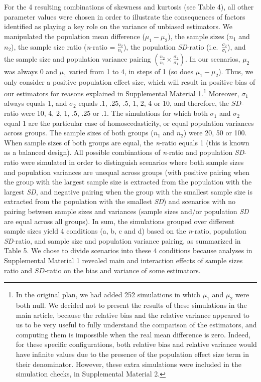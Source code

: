 \documentclass[
  english,
  man,floatsintext]{apa6}
\begin{document}
For the 4 resulting combinations of skewness and kurtosis (see Table 4), all other parameter values were chosen in order to illustrate the consequences of factors identified as playing a key role on the variance of unbiased estimators. We manipulated the population mean difference (\(\mu_1-\mu_2\)), the sample sizes (\(n_1\) and \(n_2\)), the sample size ratio (\emph{n}-ratio = \(\frac{n_2}{n_1}\)), the population \emph{SD}-ratio (i.e.~\(\frac{\sigma_2}{\sigma_1}\)), and the sample size and population variance pairing \(\left(\frac{n_2}{n_1}\times\frac{\sigma_2}{\sigma_1} \right)\). In our scenarios, \(\mu_2\) was always 0 and \(\mu_1\) varied from 1 to 4, in steps of 1 (so does \(\mu_1-\mu_2\)). Thus, we only consider a positive population effect size, which will result in positive bias of our estimators for reasons explained in Supplemental Material 1.\footnote{In the original plan, we had added 252 simulations in which $\mu_1$ and $\mu_2$ were both null. We decided not to present the results of these simulations in the main article, because the relative bias and the relative variance appeared to us to be very useful to fully understand the comparison of the estimators, and computing them is impossible when the real mean difference is zero. Indeed, for these specific configurations, both relative bias and relative variance would have infinite values due to the presence of the population effect size term in their denominator. However, these extra simulations were included in the simulation checks, in Supplemental Material 2. } Moreover, \(\sigma_1\) always equals 1, and \(\sigma_2\) equals .1, .25, .5, 1, 2, 4 or 10, and therefore, the \(SD\)-ratio were 10, 4, 2, 1, .5, .25 or .1. The simulations for which both \(\sigma_1\) and \(\sigma_2\) equal 1 are the particular case of homoscedasticity, or equal population variances across groups. The sample sizes of both groups (\(n_1\) and \(n_2\)) were 20, 50 or 100. When sample sizes of both groups are equal, the \emph{n}-ratio equals 1 (this is known as a balanced design). All possible combinations of \emph{n}-ratio and population \emph{SD}-ratio were simulated in order to distinguish scenarios where both sample sizes and population variances are unequal across groups (with positive pairing when the group with the largest sample size is extracted from the population with the largest \emph{SD}, and negative pairing when the group with the smallest sample size is extracted from the population with the smallest \emph{SD}) and scenarios with no pairing between sample sizes and variances (sample sizes and/or population \emph{SD} are equal across all groups). In sum, the simulations grouped over different sample sizes yield 4 conditions (a, b, c and d) based on the \emph{n}-ratio, population \emph{SD}-ratio, and sample size and population variance pairing, as summarized in Table 5. We chose to divide scenarios into these 4 conditions because analyses in Supplemental Material 1 revealed main and interaction effects of sample sizes ratio and \(SD\)-ratio on the bias and variance of some estimators.
\end{document}
